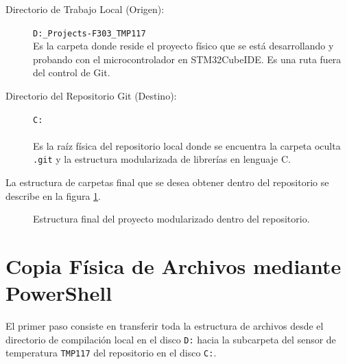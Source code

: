 \documentclass[
10pt, %
a4paper, %
oneside, %
headinclude,footinclude, %
BCOR5mm, %
]{scrartcl}
\begin{document}
\begin{description}
	\item[Directorio de Trabajo Local (Origen):] \texttt{D:\string{}\_Projects\string\NUCLEO-F303\_TMP117}\\
	Es la carpeta donde reside el proyecto físico que se está desarrollando y probando con el microcontrolador en STM32CubeIDE. Es una ruta fuera del control de Git.
	\item[Directorio del Repositorio Git (Destino):] \texttt{C:\string\Users\string\casti\string\OneDrive\string\Documentos\string\GitHub\\\string\Libraries\string\Libraries}\\
	Es la raíz física del repositorio local donde se encuentra la carpeta oculta \texttt{.git} y la estructura modularizada de librerías en lenguaje C.
\end{description}

La estructura de carpetas final que se desea obtener dentro del repositorio se describe en la figura \ref{fig_arbol_repo}.

\begin{figure}[H]
	\centering
	\begin{minipage}{0.95\textwidth}
	\end{minipage}
	\caption{Estructura final del proyecto modularizado dentro del repositorio.}\label{fig_arbol_repo}
\end{figure}

\newpage
\section{Copia Física de Archivos mediante PowerShell}

El primer paso consiste en transferir toda la estructura de archivos desde el directorio de compilación local en el disco \texttt{D:} hacia la subcarpeta del sensor de temperatura \texttt{TMP117} del repositorio en el disco \texttt{C:}.
\end{document}
